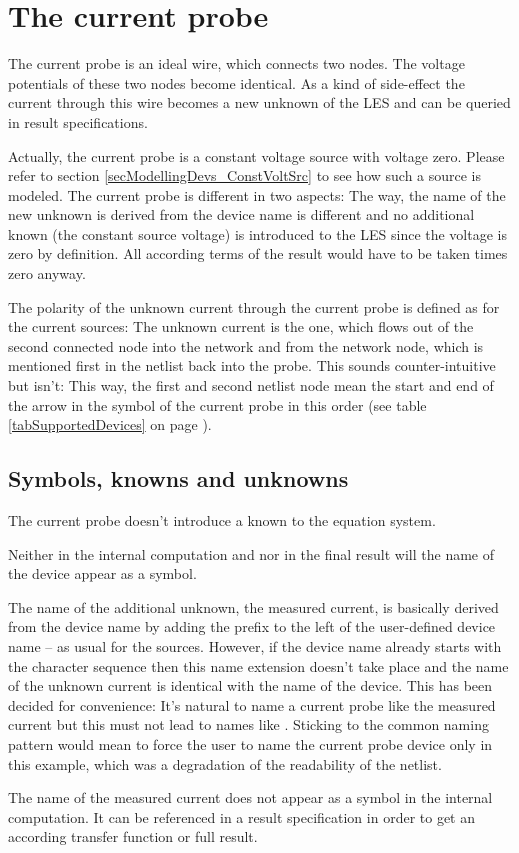 \section{The current probe}
\label{secModellingDevs_currentProbe}

The current probe is an ideal wire, which connects two nodes. The voltage
potentials of these two nodes become identical. As a kind of side-effect
the current through this wire becomes a new unknown of the LES and can be
queried in result specifications.

Actually, the current probe is a constant voltage source with voltage
zero. Please refer to section \ref{secModellingDevs_ConstVoltSrc} to see
how such a source is modeled. The current probe is different in two
aspects: The way, the name of the new unknown is derived from the device
name is different and no additional known (the constant source voltage) is
introduced to the LES since the voltage is zero by definition. All
according terms of the result would have to be taken times zero anyway.

The polarity of the unknown current through the current probe is defined
as for the current sources: The unknown current is the one, which flows
out of the second connected node into the network and from the network
node, which is mentioned first in the netlist back into the probe. This
sounds counter-intuitive but isn't: This way, the first and second netlist
node mean the start and end of the arrow in the symbol of the current
probe in this order (see table \ref{tabSupportedDevices} on page
\pageref{tabSupportedDevices}).


\subsection{Symbols, knowns and unknowns}

The current probe doesn't introduce a known to the equation system.

Neither in the internal computation and nor in the final result will the
name of the device appear as a symbol.

The name of the additional unknown, the measured current, is basically
derived from the device name by adding the prefix  to the left
of the user-defined device name -- as usual for the sources. However, if
the device name already starts with the character sequence  then
this name extension doesn't take place and the name of the unknown current
is identical with the name of the device. This has been decided for
convenience: It's natural to name a current probe like the measured
current but this must not lead to names like .
Sticking to the common naming pattern would mean to force the user to name
the current probe device only  in this example, which was
a degradation of the readability of the netlist.

The name of the measured current does not appear as a symbol in the
internal computation. It can be referenced in a result specification in
order to get an according transfer function or full result.
